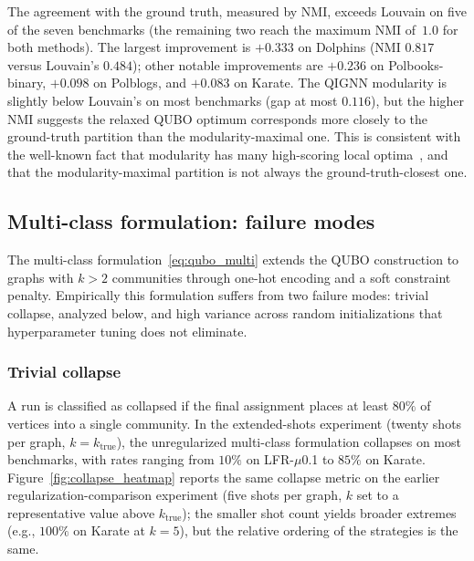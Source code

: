 The agreement with the ground truth, measured by NMI, exceeds
Louvain on five of the seven benchmarks (the remaining two reach
the maximum NMI of~$1.0$ for both methods). The largest
improvement is $+0.333$ on Dolphins (NMI $0.817$ versus Louvain's
$0.484$); other notable improvements are $+0.236$ on
Polbooks-binary, $+0.098$ on Polblogs, and $+0.083$ on Karate.
The QIGNN modularity is slightly below Louvain's on most
benchmarks (gap at most $0.116$), but the higher NMI suggests the
relaxed QUBO optimum corresponds more closely to the
ground-truth partition than the modularity-maximal one. This is
consistent with the well-known fact that modularity has many
high-scoring local optima~\cite{good2010performance}, and that
the modularity-maximal partition is not always the
ground-truth-closest one.

\subsection{Multi-class formulation: failure modes}
\label{sec:exp_collapse}

The multi-class formulation~\eqref{eq:qubo_multi} extends the
QUBO construction to graphs with $k > 2$ communities through
one-hot encoding and a soft constraint penalty. Empirically this
formulation suffers from two failure modes: trivial collapse,
analyzed below, and high variance across random initializations
that hyperparameter tuning does not eliminate.

\subsubsection{Trivial collapse}
\label{sec:exp_collapse_rate}

A run is classified as collapsed if the final assignment places
at least $80\%$ of vertices into a single community. In the
extended-shots experiment (twenty shots per graph, $k =
k_{\mathrm{true}}$), the unregularized multi-class formulation
collapses on most benchmarks, with rates ranging from $10\%$ on
LFR-$\mu$0.1 to $85\%$ on Karate.
Figure~\ref{fig:collapse_heatmap} reports the same collapse
metric on the earlier regularization-comparison experiment (five
shots per graph, $k$ set to a representative value above
$k_{\mathrm{true}}$); the smaller shot count yields broader
extremes (e.g., $100\%$ on Karate at $k=5$), but the relative
ordering of the strategies is the same.

